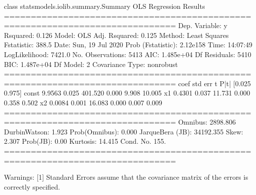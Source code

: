 \documentclass[letterpaper,10pt,english]{jupyterBook}
\begin{document}
\begin{sphinxVerbatim}[commandchars=\\\{\}]
\PYGZlt{}class \PYGZsq{}statsmodels.iolib.summary.Summary\PYGZsq{}\PYGZgt{}
\PYGZdq{}\PYGZdq{}\PYGZdq{}
                            OLS Regression Results                            
==============================================================================
Dep. Variable:                      y   R\PYGZhy{}squared:                       0.126
Model:                            OLS   Adj. R\PYGZhy{}squared:                  0.125
Method:                 Least Squares   F\PYGZhy{}statistic:                     388.5
Date:                Sun, 19 Jul 2020   Prob (F\PYGZhy{}statistic):          2.12e\PYGZhy{}158
Time:                        14:07:49   Log\PYGZhy{}Likelihood:                \PYGZhy{}7421.0
No. Observations:                5413   AIC:                         1.485e+04
Df Residuals:                    5410   BIC:                         1.487e+04
Df Model:                           2                                         
Covariance Type:            nonrobust                                         
==============================================================================
                 coef    std err          t      P\PYGZgt{}|t|      [0.025      0.975]
\PYGZhy{}\PYGZhy{}\PYGZhy{}\PYGZhy{}\PYGZhy{}\PYGZhy{}\PYGZhy{}\PYGZhy{}\PYGZhy{}\PYGZhy{}\PYGZhy{}\PYGZhy{}\PYGZhy{}\PYGZhy{}\PYGZhy{}\PYGZhy{}\PYGZhy{}\PYGZhy{}\PYGZhy{}\PYGZhy{}\PYGZhy{}\PYGZhy{}\PYGZhy{}\PYGZhy{}\PYGZhy{}\PYGZhy{}\PYGZhy{}\PYGZhy{}\PYGZhy{}\PYGZhy{}\PYGZhy{}\PYGZhy{}\PYGZhy{}\PYGZhy{}\PYGZhy{}\PYGZhy{}\PYGZhy{}\PYGZhy{}\PYGZhy{}\PYGZhy{}\PYGZhy{}\PYGZhy{}\PYGZhy{}\PYGZhy{}\PYGZhy{}\PYGZhy{}\PYGZhy{}\PYGZhy{}\PYGZhy{}\PYGZhy{}\PYGZhy{}\PYGZhy{}\PYGZhy{}\PYGZhy{}\PYGZhy{}\PYGZhy{}\PYGZhy{}\PYGZhy{}\PYGZhy{}\PYGZhy{}\PYGZhy{}\PYGZhy{}\PYGZhy{}\PYGZhy{}\PYGZhy{}\PYGZhy{}\PYGZhy{}\PYGZhy{}\PYGZhy{}\PYGZhy{}\PYGZhy{}\PYGZhy{}\PYGZhy{}\PYGZhy{}\PYGZhy{}\PYGZhy{}\PYGZhy{}\PYGZhy{}
const          9.9563      0.025    401.520      0.000       9.908      10.005
x1             0.4301      0.037     11.731      0.000       0.358       0.502
x2             0.0084      0.001     16.083      0.000       0.007       0.009
==============================================================================
Omnibus:                     2898.806   Durbin\PYGZhy{}Watson:                   1.923
Prob(Omnibus):                  0.000   Jarque\PYGZhy{}Bera (JB):            34192.355
Skew:                          \PYGZhy{}2.307   Prob(JB):                         0.00
Kurtosis:                      14.415   Cond. No.                         155.
==============================================================================

Warnings:
[1] Standard Errors assume that the covariance matrix of the errors is correctly specified.
\PYGZdq{}\PYGZdq{}\PYGZdq{}
\end{sphinxVerbatim}
\end{document}
